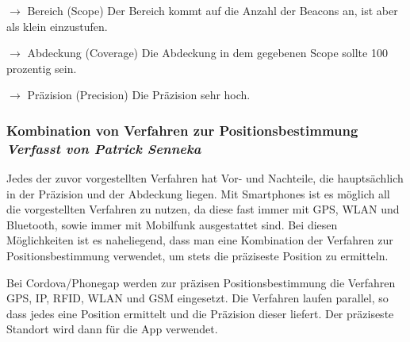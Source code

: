 $\longrightarrow$ Bereich (Scope) Der Bereich kommt auf die Anzahl der Beacons an, ist aber als klein einzustufen.

$\longrightarrow$ Abdeckung (Coverage) Die Abdeckung in dem gegebenen Scope sollte 100 prozentig sein.

$\longrightarrow$ Präzision (Precision) Die Präzision sehr hoch. 






\subsubsection[Kombination von Verfahren zur Positionsbestimmung]{Kombination von Verfahren zur Positionsbestimmung
 \\ \textnormal{\small{\textit {Verfasst von Patrick Senneka}}}}

Jedes der zuvor vorgestellten Verfahren hat Vor- und Nachteile, die hauptsächlich in der Präzision und der Abdeckung liegen.
Mit Smartphones ist es möglich all die vorgestellten Verfahren zu nutzen, da diese fast immer mit GPS, WLAN und Bluetooth, sowie immer mit Mobilfunk ausgestattet sind.
Bei diesen Möglichkeiten ist es naheliegend, dass man eine Kombination der Verfahren zur Positionsbestimmung verwendet, um stets die präziseste Position zu ermitteln. 

Bei Cordova/Phonegap werden zur präzisen Positionsbestimmung die Verfahren GPS, IP, RFID, WLAN und GSM eingesetzt. \cite{phonegap2015}
Die Verfahren laufen parallel, so dass jedes eine Position ermittelt und die Präzision dieser liefert. Der präziseste Standort wird dann für die App verwendet.